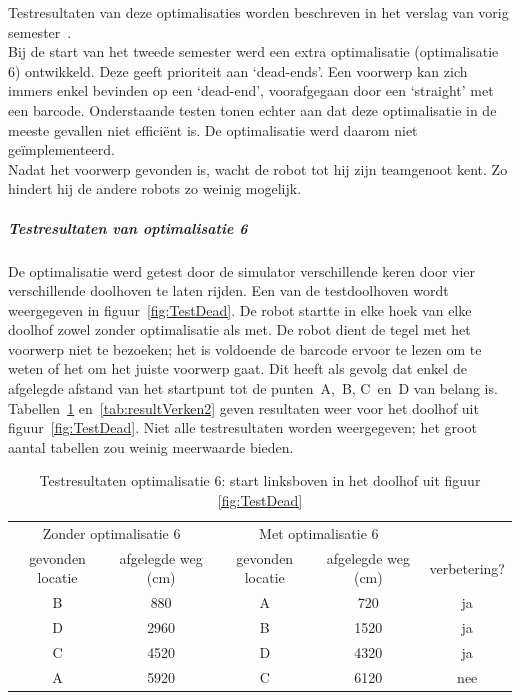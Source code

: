 \documentclass[eind]{penoverslag}
\begin{document}
Testresultaten van deze optimalisaties worden beschreven in het verslag van vorig semester~\cite{Verslag1}.\\

Bij de start van het tweede semester werd een extra optimalisatie (optimalisatie 6) ontwikkeld. Deze geeft prioriteit aan `dead-ends'. Een voorwerp kan zich immers enkel bevinden op een `dead-end', voorafgegaan door een `straight' met een barcode. Onderstaande testen tonen echter aan dat deze optimalisatie in de meeste gevallen niet effici\"ent is. De optimalisatie werd daarom niet ge\"implementeerd.\\

Nadat het voorwerp gevonden is, wacht de robot tot hij zijn teamgenoot kent. Zo hindert hij de andere robots zo weinig mogelijk.

\subparagraph{Testresultaten van optimalisatie 6}
\label{par:AlgoZoekTest}
De optimalisatie werd getest door de simulator verschillende keren door vier verschillende doolhoven te laten rijden. Een van de testdoolhoven wordt weergegeven in figuur~\ref{fig:TestDead}. De robot startte in elke hoek van elke doolhof zowel zonder optimalisatie als met. De robot dient de tegel met het voorwerp niet te bezoeken; het is voldoende de barcode ervoor te lezen om te weten of het om het juiste voorwerp gaat. Dit heeft als gevolg dat enkel de afgelegde afstand van het startpunt tot de punten~A,~B, C~en~D van belang is. Tabellen~\ref{tab:resultVerken1} en~\ref{tab:resultVerken2} geven resultaten weer voor het doolhof uit figuur~\ref{fig:TestDead}. Niet alle testresultaten worden weergegeven; het groot aantal tabellen zou weinig meerwaarde bieden.\\

\begin{table}[h]
\begin{center}
    \begin{tabular}{ c | c | c | c | c}
   \multicolumn{2}{c|}{Zonder optimalisatie 6} & \multicolumn{2}{|c|}{Met optimalisatie 6} & \\
     gevonden locatie & afgelegde weg (cm) & gevonden locatie &  afgelegde weg (cm) & verbetering?\\ \hline\hline
    B & 880 & A & 720 & ja \\ \hline
    D & 2960 & B & 1520 & ja \\ \hline
    C & 4520 & D & 4320 & ja\\ \hline
    A & 5920 & C & 6120 & nee\\
    \end{tabular}
    \caption{Testresultaten optimalisatie 6: start linksboven in het doolhof uit figuur \ref{fig:TestDead}}
    \label{tab:resultVerken1}
\end{center}
\end{table}
\end{document}
